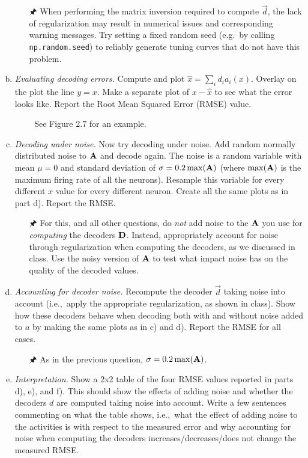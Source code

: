 \begin{enumerate}[a)]
		\begin{itemize}
			\item[{\symbolfont 🖈}] When performing the matrix inversion required to compute $\vec d$, the lack of regularization may result in numerical issues and corresponding warning messages. Try setting a fixed random seed (e.g.~by calling \texttt{np.random.seed}) to reliably generate tuning curves that do not have this problem.
		\end{itemize}
		\item {} \textit{Evaluating decoding errors.} Compute and plot $\hat{x}=\sum_i d_i a_i(x)$. Overlay on the plot the line $y=x$. Make a separate plot of $x-\hat{x}$ to see what the error looks like. Report the Root Mean Squared Error (RMSE) value.
		\begin{itemize}
			\item[{\symbolfont 📖}] See Figure 2.7 for an example.
		\end{itemize}
		\item {} \textit{Decoding under noise.} Now try decoding under noise. Add random normally distributed noise to ${\mathbf{A}}$ and decode again. The noise is a random variable with mean $\mu=0$ and standard deviation of $\sigma=0.2 \max({\mathbf{A}})$ (where $\max({\mathbf{A}})$ is the maximum firing rate of all the neurons). Resample this variable for every different $x$ value for every different neuron. Create all the same plots as in part d). Report the RMSE.
		\begin{itemize}
			 \item[{\symbolfont 🖈}] For this, and all other questions, do \textit{not} add noise to the ${\mathbf{A}}$ you use for \emph{computing} the decoders ${\mathbf{D}}$. Instead, appropriately account for noise through regularization when computing the decoders, as we discussed in class. Use the noisy version of ${\mathbf{A}}$ to test what impact noise has on the quality of the decoded values.
		\end{itemize}
		\item {} \textit{Accounting for decoder noise.} Recompute the decoder $\vec d$ taking noise into account (i.e.,~apply the appropriate regularization, as shown in class). Show how these decoders behave when decoding both with and without noise added to $a$ by making the same plots as in c) and d). Report the RMSE for all cases.
		\begin{itemize}
			\item[{\symbolfont 🖈}] As in the previous question, $\sigma = 0.2 \max({\mathbf{A}})$.
		\end{itemize}
		\item {} \textit{Interpretation.} Show a 2x2 table of the four RMSE values reported in parts d), e), and f). This should show the effects of adding noise and whether the decoders $d$ are computed taking noise into account. Write a few sentences commenting on what the table shows, i.e.,~what the effect of adding noise to the activities is with respect to the measured error and why accounting for noise when computing the decoders increases/decreases/does not change the measured RMSE.
	\end{enumerate}

